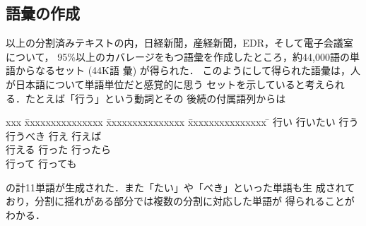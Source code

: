 \subsection{語彙の作成}
\vspace{-1mm}
以上の分割済みテキストの内，日経新聞，産経新聞，EDR，そして電子会議室について，
95\%以上のカバレージをもつ語彙を作成したところ，約44,000語の単語からなるセット
(44K語\break
彙) が得られた．
  このようにして得られた語彙は，人が日本語について単語単位だと感覚的に思う
セットを示していると考えられる．たとえば「行う」という動詞とその
後続の付属語列からは
\smallskip
\begin{tabbing}
   xxx \= xxxxxxxxxxxxxxx \= xxxxxxxxxxxxxxx \= xxxxxxxxxxxxxxx \= \kill
       \> 行い            \> 行いたい        \> 行う            \\
       \> 行うべき        \> 行え            \> 行えば          \\
       \> 行える          \> 行った          \> 行ったら        \\
       \> 行って          \> 行っても        \>                 \\
\end{tabbing}
の計11単語が生成された．また「たい」や「べき」といった単語も生
成されており，分割に揺れがある部分では複数の分割に対応した単語が
得られることがわかる．

